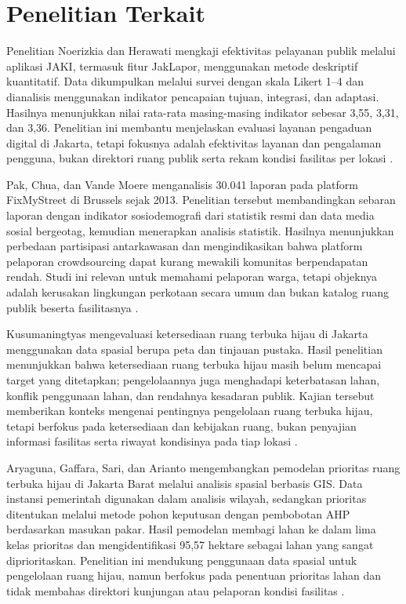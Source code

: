 \documentclass[conference]{IEEEtran}
\begin{document}
\section{Penelitian Terkait}

Penelitian Noerizkia dan Herawati mengkaji efektivitas pelayanan publik melalui aplikasi JAKI, termasuk fitur JakLapor, menggunakan metode deskriptif kuantitatif. Data dikumpulkan melalui survei dengan skala Likert 1--4 dan dianalisis menggunakan indikator pencapaian tujuan, integrasi, dan adaptasi. Hasilnya menunjukkan nilai rata-rata masing-masing indikator sebesar 3,55, 3,31, dan 3,36. Penelitian ini membantu menjelaskan evaluasi layanan pengaduan digital di Jakarta, tetapi fokusnya adalah efektivitas layanan dan pengalaman pengguna, bukan direktori ruang publik serta rekam kondisi fasilitas per lokasi \cite{jaki}.

Pak, Chua, dan Vande Moere menganalisis 30.041 laporan pada platform FixMyStreet di Brussels sejak 2013. Penelitian tersebut membandingkan sebaran laporan dengan indikator sosiodemografi dari statistik resmi dan data media sosial bergeotag, kemudian menerapkan analisis statistik. Hasilnya menunjukkan perbedaan partisipasi antarkawasan dan mengindikasikan bahwa platform pelaporan crowdsourcing dapat kurang mewakili komunitas berpendapatan rendah. Studi ini relevan untuk memahami pelaporan warga, tetapi objeknya adalah kerusakan lingkungan perkotaan secara umum dan bukan katalog ruang publik beserta fasilitasnya \cite{pak2017}.

Kusumaningtyas mengevaluasi ketersediaan ruang terbuka hijau di Jakarta menggunakan data spasial berupa peta dan tinjauan pustaka. Hasil penelitian menunjukkan bahwa ketersediaan ruang terbuka hijau masih belum mencapai target yang ditetapkan; pengelolaannya juga menghadapi keterbatasan lahan, konflik penggunaan lahan, dan rendahnya kesadaran publik. Kajian tersebut memberikan konteks mengenai pentingnya pengelolaan ruang terbuka hijau, tetapi berfokus pada ketersediaan dan kebijakan ruang, bukan penyajian informasi fasilitas serta riwayat kondisinya pada tiap lokasi \cite{kusumaningtyas2024}.

Aryaguna, Gaffara, Sari, dan Arianto mengembangkan pemodelan prioritas ruang terbuka hijau di Jakarta Barat melalui analisis spasial berbasis GIS. Data instansi pemerintah digunakan dalam analisis wilayah, sedangkan prioritas ditentukan melalui metode pohon keputusan dengan pembobotan AHP berdasarkan masukan pakar. Hasil pemodelan membagi lahan ke dalam lima kelas prioritas dan mengidentifikasi 95,57 hektare sebagai lahan yang sangat diprioritaskan. Penelitian ini mendukung penggunaan data spasial untuk pengelolaan ruang hijau, namun berfokus pada penentuan prioritas lahan dan tidak membahas direktori kunjungan atau pelaporan kondisi fasilitas \cite{aryaguna2022}.
\end{document}
